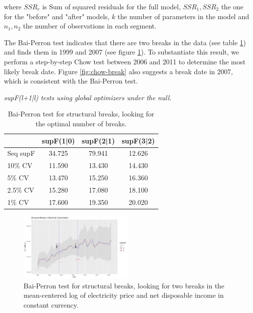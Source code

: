 where $SSR_r$ is Sum of squared residuals for the full model, $SSR_1, SSR_2$ the one for the "before" and "after" models, $k$ the number of parameters in the model and $n_1, n_2$ the number of observations in each segment. 

The Bai-Perron test indicates that there are two breaks in the data (see table \ref{tab:supF_tests}) and finds them in 1999 and 2007 (see figure \ref{fig:bai-perron-break}). To substantiate this result, we perform a step-by-step Chow test between 2006 and 2011 to determine the most likely break date. Figure \ref{fig:chow-break} also suggests a break date in 2007, which is consistent with the Bai-Perron test.

\begin{table}[!htbp] 
    \centering
    \caption{Bai-Perron test for structural breaks, looking for the optimal number of breaks.} \vspace{0.1cm}
    \label{tab:supF_tests}
    \textit{supF(l+1|l) tests using global optimizers under the null.}
    \begin{tabular}{lccc}
        \\[-1.8ex] \toprule
        & \textbf{supF(1|0)} & \textbf{supF(2|1)} & \textbf{supF(3|2)} \\
        \midrule
        Seq supF & 34.725 & 79.941 & 12.626 \\
        \midrule
        10\% CV  & 11.590 & 13.430 & 14.430 \\
        5\% CV   & 13.470 & 15.250 & 16.360 \\
        2.5\% CV & 15.280 & 17.080 & 18.100 \\
        1\% CV   & 17.600 & 19.350 & 20.020 \\
        \bottomrule
    \end{tabular}
\end{table}

\begin{figure}[h]
    \centering
      \includegraphics[width=0.5\textwidth]{Images/structural_breaks.jpeg}
      \caption{Bai-Perron test for structural breaks, looking for two breaks in the mean-centered log of electricity price and net disposable income in constant currency.}
    \label{fig:bai-perron-break}
  \end{figure}


